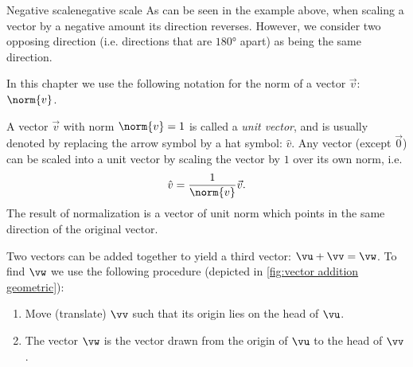 \begin{note}{Negative scale}{negative scale}
	As can be seen in the example above, when scaling a vector by a negative amount its direction reverses. However, we consider two opposing direction (i.e. directions that are $\ang{180}$ apart) as being the same direction.
\end{note}

In this chapter we use the following notation for the norm of a vector $\vec{v}$: $\norm{v}$.

A vector $\vec{v}$ with norm $\norm{v}=1$ is called a \emph{unit vector}, and is usually denoted by replacing the arrow symbol by a hat symbol: $\hat{v}$. Any vector (except $\vec{0}$) can be scaled into a unit vector by scaling  the vector by $1$ over its own norm, i.e.
\begin{equation}
	\hat{v} = \frac{1}{\norm{v}}\vec{v}.
	\label{eq:unit_vector}
\end{equation}
The result of normalization is a vector of unit norm which points in the same direction of the original vector.

Two vectors can be added together to yield a third vector: $\vu+\vv=\vw$. To find $\vw$ we use the following procedure (depicted in \autoref{fig:vector addition geometric}):
\begin{enumerate}
	\item Move (translate) $\vv$ such that its origin lies on the head of $\vu$.
	\item The vector $\vw$ is the vector drawn from the origin of $\vu$ to the head of $\vv$.
\end{enumerate}

